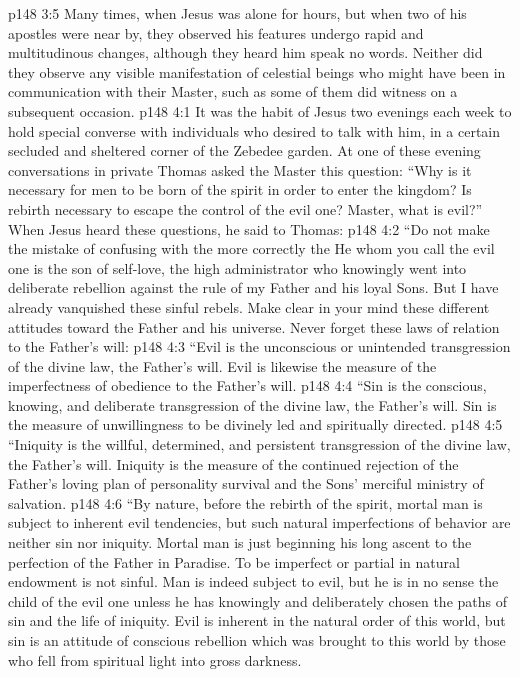 \vs p148 3:5 Many times, when Jesus was alone for hours, but when two of his apostles were near by, they observed his features undergo rapid and multitudinous changes, although they heard him speak no words. Neither did they observe any visible manifestation of celestial beings who might have been in communication with their Master, such as some of them did witness on a subsequent occasion.
\vs p148 4:1 It was the habit of Jesus two evenings each week to hold special converse with individuals who desired to talk with him, in a certain secluded and sheltered corner of the Zebedee garden. At one of these evening conversations in private Thomas asked the Master this question: “Why is it necessary for men to be born of the spirit in order to enter the kingdom? Is rebirth necessary to escape the control of the evil one? Master, what is evil?” When Jesus heard these questions, he said to Thomas:
\pc \vs p148 4:2 \textcolor{ubdarkred}{“Do not make the mistake of confusing  with the  more correctly the  He whom you call the evil one is the son of self\hyp{}love, the high administrator who knowingly went into deliberate rebellion against the rule of my Father and his loyal Sons. But I have already vanquished these sinful rebels. Make clear in your mind these different attitudes toward the Father and his universe. Never forget these laws of relation to the Father’s will:}
\vs p148 4:3 \textcolor{ubdarkred}{“Evil is the unconscious or unintended transgression of the divine law, the Father’s will. Evil is likewise the measure of the imperfectness of obedience to the Father’s will.}
\vs p148 4:4 \textcolor{ubdarkred}{“Sin is the conscious, knowing, and deliberate transgression of the divine law, the Father’s will. Sin is the measure of unwillingness to be divinely led and spiritually directed.}
\vs p148 4:5 \textcolor{ubdarkred}{“Iniquity is the willful, determined, and persistent transgression of the divine law, the Father’s will. Iniquity is the measure of the continued rejection of the Father’s loving plan of personality survival and the Sons’ merciful ministry of salvation.}
\vs p148 4:6 \textcolor{ubdarkred}{“By nature, before the rebirth of the spirit, mortal man is subject to inherent evil tendencies, but such natural imperfections of behavior are neither sin nor iniquity. Mortal man is just beginning his long ascent to the perfection of the Father in Paradise. To be imperfect or partial in natural endowment is not sinful. Man is indeed subject to evil, but he is in no sense the child of the evil one unless he has knowingly and deliberately chosen the paths of sin and the life of iniquity. Evil is inherent in the natural order of this world, but sin is an attitude of conscious rebellion which was brought to this world by those who fell from spiritual light into gross darkness.}

